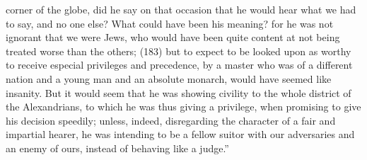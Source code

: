 corner of the globe, did he say on that occasion that he would hear what we had to say, and no one
else? What could have been his meaning? for he was not ignorant that we were Jews, who would
have been quite content at not being treated worse than the others; (183) but to expect to be
looked upon as worthy to receive especial privileges and precedence, by a master who was of a
different nation and a young man and an absolute monarch, would have seemed like insanity. But it
would seem that he was showing civility to the whole district of the Alexandrians, to which he was
thus giving a privilege, when promising to give his decision speedily; unless, indeed, disregarding
the character of a fair and impartial hearer, he was intending to be a fellow suitor with our
adversaries and an enemy of ours, instead of behaving like a judge.''

